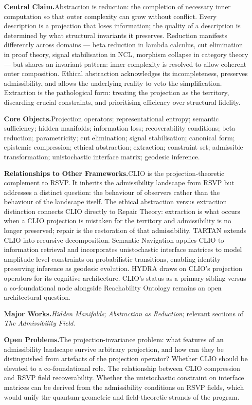 \documentclass[12pt, twoside]{article}
\newcommand{\frameworkbody}[5]{  \noindent\textbf{Central Claim.}\quad #1

  \noindent\textbf{Core Objects.}\quad #2

  \noindent\textbf{Relationships to Other Frameworks.}\quad #3

  \noindent\textbf{Major Works.}\quad #4

  \noindent\textbf{Open Problems.}\quad #5
  \medskip
}
\begin{document}
\frameworkbody{Abstraction is reduction: the completion of necessary inner computation so
that outer complexity can grow without conflict. Every description is a
projection that loses information; the quality of a description is determined
by what structural invariants it preserves. Reduction manifests differently
across domains — beta reduction in lambda calculus, cut elimination in proof
theory, signal stabilisation in NCL, morphism collapse in category theory —
but shares an invariant pattern: inner complexity is resolved to allow
coherent outer composition. Ethical abstraction acknowledges its
incompleteness, preserves admissibility, and allows the underlying reality
to veto the simplification. Extraction is the pathological form: treating
the projection as the territory, discarding crucial constraints, and
prioritising efficiency over structural fidelity.}{Projection operators; representational entropy; semantic sufficiency;
hidden manifolds; information loss; recoverability conditions; beta
reduction; parametricity; cut elimination; signal stabilisation; canonical
form; epistemic compression; ethical abstraction; extraction; constraint
set; admissible transformation; unistochastic interface matrix; geodesic
inference.}{CLIO is the projection-theoretic complement to RSVP. It inherits the
admissibility landscape from RSVP but addresses a distinct question: the
behaviour of observers rather than the behaviour of the landscape itself.
The ethical abstraction versus extraction distinction connects CLIO directly
to Repair Theory: extraction is what occurs when a CLIO projection is
mistaken for the territory and admissibility is no longer preserved; repair
is the restoration of that admissibility. TARTAN extends CLIO into recursive
decomposition. Semantic Navigation applies CLIO to information retrieval and
incorporates unistochastic interface matrices to model amplitude-level
constraints on probabilistic transitions, enabling identity-preserving
inference as geodesic evolution. HYDRA draws on CLIO's projection operators
for its cognitive architecture. CLIO's status as a primary sibling versus a
co-foundational node alongside Reachability Ontology remains an open
architectural question.}{\emph{Hidden Manifolds}; \emph{Abstraction as Reduction}; relevant sections
of \emph{The Admissibility Field}.}{The projection-invariance problem: what features of an admissibility
landscape survive arbitrary projection, and how can they be distinguished
from artefacts of the projection operator? Whether CLIO should be elevated
to a co-foundational role. The relationship between CLIO compression and
RSVP field recoverability. Whether the unistochastic constraint on interface
matrices can be derived from the admissibility conditions on RSVP fields,
which would unify the quantum-geometric and field-theoretic strands of the
program.}
\end{document}
